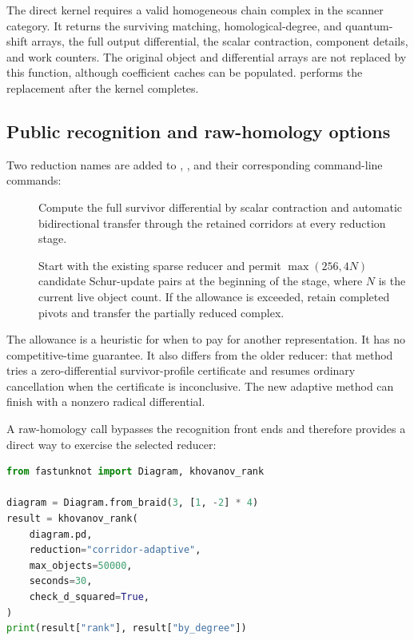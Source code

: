 The direct kernel  requires a valid
homogeneous chain complex in the scanner category. It returns the
surviving matching, homological-degree, and quantum-shift arrays, the
full output differential, the scalar contraction, component details,
and work counters. The original object and differential arrays are
not replaced by this function, although coefficient caches can be
populated.  performs the replacement after the
kernel completes.

\subsection{Public recognition and raw-homology options}

Two reduction names are added to ,
, and their corresponding command-line commands:
\begin{description}
\item[]
Compute the full survivor differential by scalar contraction and
automatic bidirectional transfer through the retained corridors at
every reduction stage.
\item[]
Start with the existing sparse reducer and permit
\(\max(256,4N)\) candidate Schur-update pairs at the beginning of
the stage, where \(N\) is the current live object count. If the
allowance is exceeded, retain completed pivots and transfer the
partially reduced complex.
\end{description}

The allowance is a heuristic for when to pay for another
representation. It has no competitive-time guarantee. It also
differs from the older  reducer: that method tries a
zero-differential survivor-profile certificate and resumes ordinary
cancellation when the certificate is inconclusive. The new adaptive
method can finish with a nonzero radical differential.

A raw-homology call bypasses the recognition front ends and therefore
provides a direct way to exercise the selected reducer:

\begin{lstlisting}[language=Python]
from fastunknot import Diagram, khovanov_rank

diagram = Diagram.from_braid(3, [1, -2] * 4)
result = khovanov_rank(
    diagram.pd,
    reduction="corridor-adaptive",
    max_objects=50000,
    seconds=30,
    check_d_squared=True,
)
print(result["rank"], result["by_degree"])
\end{lstlisting}

